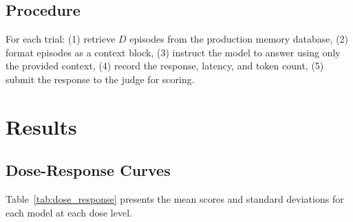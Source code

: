 \documentclass[11pt,a4paper]{article}
\begin{document}
\subsection{Procedure}
For each trial: (1) retrieve $D$ episodes from the production memory database, (2) format episodes as a context block, (3) instruct the model to answer using only the provided context, (4) record the response, latency, and token count, (5) submit the response to the judge for scoring.

\section{Results}

\subsection{Dose-Response Curves}

Table~\ref{tab:dose_response} presents the mean scores and standard deviations for each model at each dose level.
\end{document}
